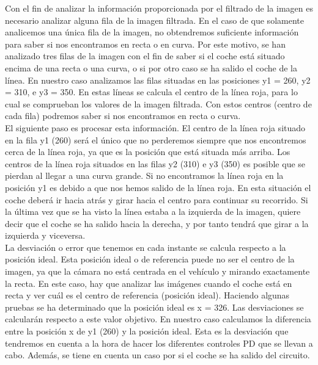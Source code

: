 Con el fin de analizar la información proporcionada por el filtrado de la imagen es necesario analizar alguna fila de la imagen filtrada. En el caso de que solamente analicemos una única fila de la imagen, no obtendremos suficiente información para saber si nos encontramos en recta o en curva. Por este motivo, se han analizado tres filas de la imagen con el fin de saber si el coche está situado encima de una recta o una curva, o si por otro caso se ha salido el coche de la línea. En nuestro caso analizamos las filas situadas en las posiciones y1 = 260, y2 = 310, e y3 = 350. En estas líneas se calcula el centro de la línea roja, para lo cual se comprueban los valores de la imagen filtrada. Con estos centros (centro de cada fila) podremos saber si nos encontramos en recta o curva.\\

El siguiente paso es procesar esta información. El centro de la línea roja situado en la fila y1 (260) será el único que no perderemos siempre que nos encontremos cerca de la línea roja, ya que es la posición que está situada más arriba. Los centros de la línea roja situados en las filas y2 (310) e y3 (350) es posible que se pierdan al llegar a una curva grande. Si no encontramos la línea roja en la posición y1 es debido a que nos hemos salido de la línea roja. En esta situación el coche deberá ir hacia atrás y girar hacia el centro para continuar su recorrido. Si la última vez que se ha visto la línea estaba a la izquierda de la imagen, quiere decir que el coche se ha salido hacia la derecha, y por tanto tendrá que girar a la izquierda y viceversa. \\

La desviación o error que tenemos en cada instante se calcula respecto a la posición ideal. Esta posición ideal o de referencia puede no ser el centro de la imagen, ya que la cámara no está centrada en el vehículo y mirando exactamente la recta. En este caso, hay que analizar las imágenes cuando el coche está en recta y ver cuál es el centro de referencia (posición ideal). Haciendo algunas pruebas se ha determinado que la posición ideal es x = 326. Las desviaciones se calcularán respecto a este valor objetivo. En nuestro caso calculamos la diferencia entre la posición x de y1 (260) y la posición ideal. Esta es la desviación que tendremos en cuenta a la hora de hacer los diferentes controles PD que se llevan a cabo. Además, se tiene en cuenta un caso por si el coche se ha salido del circuito.\\

